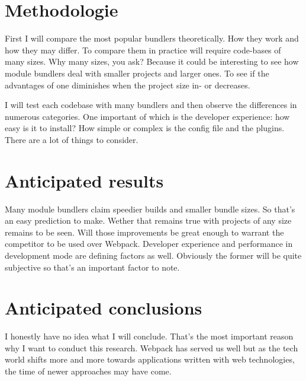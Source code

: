 \section{Methodologie}
\label{sec:methodologie}

First I will compare the most popular bundlers theoretically. How they work and how they may differ. 
To compare them in practice will require code-bases of many sizes. Why many sizes, you ask? Because it could be interesting to see how module bundlers deal with smaller projects and larger ones. To see if the advantages of one diminishes when the project size in- or decreases. 

I will test each codebase with many bundlers and then observe the differences in numerous categories. One important of which is the developer experience: how easy is it to install? How simple or complex is the config file and the plugins. There are a lot of things to consider. 

\section{Anticipated results}
\label{sec:verwachte_resultaten}

Many module bundlers claim speedier builds and smaller bundle sizes. So that's an easy prediction to make. Wether that remains true with projects of any size remains to be seen. Will those improvements be great enough to warrant the competitor to be used over Webpack. Developer experience and performance in development mode are defining factors as well. Obviously the former will be quite subjective so that's an important factor to note.

\section{Anticipated conclusions}
\label{sec:verwachte_conclusies}

I honestly have no idea what I will conclude. That's the most important reason why I want to conduct this research. Webpack has served us well but as the tech world shifts more and more towards applications written with web technologies, the time of newer approaches may have come.

